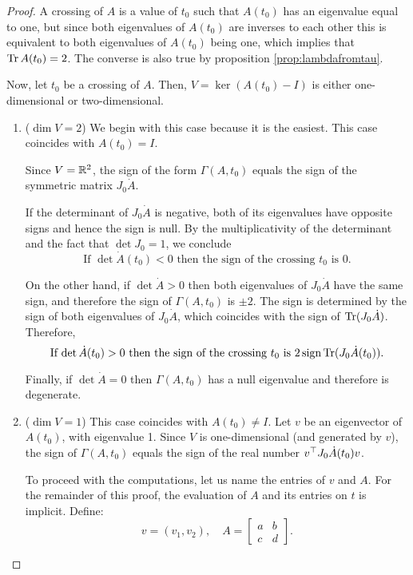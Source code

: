 \begin{proof}
A crossing of $A$ is a value of $t_0$ such that $A(t_0)$ has an eigenvalue equal to one, but since both eigenvalues of $A(t_0)$ are inverses to each other this is equivalent to both eigenvalues of $A(t_0)$ being one, which implies that $\operatorname{Tr} A(t_0) = 2$. The converse is also true by proposition \ref{prop:lambdafromtau}.

Now, let $t_0$ be a crossing of $A$. Then, $V = \ker(A(t_0) - I)$ is either one-dimensional or two-dimensional.

\begin{enumerate}[label={Case \arabic*.}]
\item ($\dim V = 2$) We begin with this case because it is the easiest. This case coincides with $A(t_0) = I$.

Since $V = \mathbb{R}^2$, the sign of the form $\Gamma(A,t_0)$ equals the sign of the symmetric matrix $J_0 \dot A$.

If the determinant of $J_0 \dot A$ is negative, both of its eigenvalues have opposite signs and hence the sign is null. By the multiplicativity of the determinant and the fact that $\det J_0 = 1$, we conclude
\begin{equation}
\text{If $\det \dot A(t_0) < 0$ then the sign of the crossing $t_0$ is 0.}
\end{equation}

On the other hand, if $\det \dot A > 0$ then both eigenvalues of $J_0 \dot A$ have the same sign, and therefore the sign of $\Gamma(A,t_0)$ is $\pm 2$. The sign is determined by the sign of both eigenvalues of $J_0 \dot A$, which coincides with the sign of $\operatorname{Tr}(J_0 \dot A)$. Therefore,
\begin{equation}
\text{If $\det \dot A(t_0) > 0$ then the sign of the crossing $t_0$ is $2 \operatorname{sign} \operatorname{Tr}(J_0 \dot A(t_0))$.}
\end{equation}

Finally, if $\det \dot A = 0$ then $\Gamma(A,t_0)$ has a null eigenvalue and therefore is degenerate.

\item ($\dim V = 1$) This case coincides with $A(t_0) \neq I$. Let $v$ be an eigenvector of $A(t_0)$, with eigenvalue 1. Since $V$ is one-dimensional (and generated by $v$), the sign of $\Gamma(A,t_0)$ equals the sign of the real number $v^\top J_0 \dot A(t_0) v$.

To proceed with the computations, let us name the entries of $v$ and $A$. For the remainder of this proof, the evaluation of $A$ and its entries on $t$ is implicit. Define:
\begin{equation}
v = (v_1, v_2), \quad
A = \begin{bmatrix} a & b \\ c & d \end{bmatrix}.
\end{equation}


\end{enumerate}
\end{proof}
